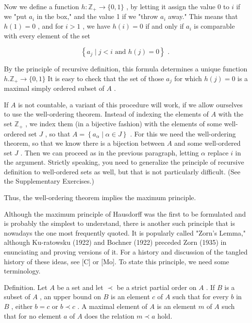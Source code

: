 \documentclass[10pt]{article}
\begin{document}
Now we define a function \(h : {\mathbb{Z}}_{ + } \rightarrow  \{ 0,1\}\) , by letting it assign the value 0 to \(i\) if we "put \({a}_{i}\) in the box," and the value 1 if we "throw \({a}_{i}\) away." This means that \(h\left( 1\right)  = 0\) , and for \(i > 1\) , we have \(h\left( i\right)  = 0\) if and only if \({a}_{i}\) is comparable with every element of the set

\[
\left\{  {{a}_{j} \mid  j < i\text{ and }h\left( j\right)  = 0}\right\}  \text{ . }
\]

By the principle of recursive definition, this formula determines a unique function \(h.{\mathbb{Z}}_{ + } \rightarrow  \{ 0,1\}\) It is easy to check that the set of those \({a}_{j}\) for which \(h\left( j\right)  = 0\) is a maximal simply ordered subset of \(A\) .

If \(A\) is not countable, a variant of this procedure will work, if we allow ourselves to use the well-ordering theorem. Instead of indexing the elements of \(A\) with the set \({\mathbb{Z}}_{ + }\) , we index them (in a bijective fashion) with the elements of some well-ordered set \(J\) , so that \(A = \left\{  {{a}_{\alpha } \mid  \alpha  \in  J}\right\}\) . For this we need the well-ordering theorem, so that we know there is a bijection between \(A\) and some well-ordered set \(J\) . Then we can proceed as in the previous paragraph, letting \(\alpha\) replace \(i\) in the argument. Strictly speaking, you need to generalize the principle of recursive definition to well-ordered sets as well, but that is not particularly difficult. (See the Supplementary Exercises.)

Thus, the well-ordering theorem implies the maximum principle.

Although the maximum principle of Hausdorff was the first to be formulated and is probably the simplest to understand, there is another such principle that is nowadays the one most frequently quoted. It is popularly called "Zorn's Lemma," although Ku-ratowsku (1922) and Bochner (1922) preceded Zorn (1935) in enunciating and proving versions of it. For a history and discussion of the tangled history of these ideas, see [C] or [Mo]. To state this principle, we need some terminology.

Definition. Let \(A\) be a set and let \(\prec\) be a strict partial order on \(A\) . If \(B\) is a subset of \(A\) , an upper bound on \(B\) is an element \(c\) of \(A\) such that for every \(b\) in \(B\) , either \(b = c\) or \(b \prec  c\) . A maximal element of \(A\) is an element \(m\) of \(A\) such that for no element \(a\) of \(A\) does the relation \(m \prec  a\) hold.
\end{document}
